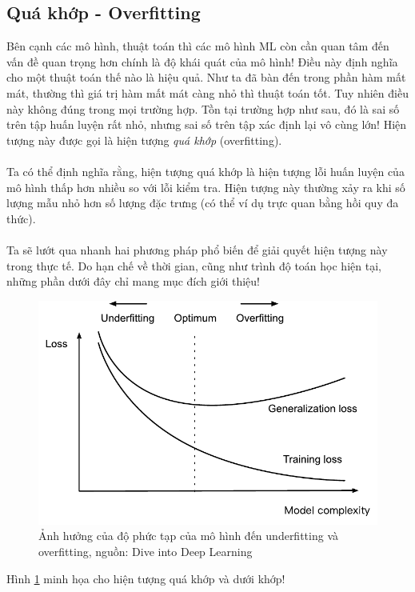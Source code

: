 \documentclass{article}
\begin{document}
 \subsection{Quá khớp - Overfitting}
 Bên cạnh các mô hình, thuật toán thì các mô hình ML còn cần quan tâm đến vấn đề quan trọng hơn chính là độ khái quát của mô hình! Điều này định nghĩa cho một thuật toán thế nào là hiệu quả. Như ta đã bàn đến trong phần hàm mất mát, thường thì giá trị hàm mất mát càng nhỏ thì thuật toán tốt. Tuy nhiên điều này không đúng trong mọi trường hợp. Tồn tại trường hợp như sau, đó là sai số trên tập huấn luyện rất nhỏ, nhưng sai số trên tập xác định lại vô cùng lớn! Hiện tượng này được gọi là hiện tượng \textit{quá khớp} (overfitting).\\\\
 Ta có thể định nghĩa rằng, hiện tượng quá khớp là hiện tượng lỗi huấn luyện của mô hình thấp hơn nhiều so với lỗi kiểm tra. Hiện tượng này thường xảy ra khi số lượng mẫu nhỏ hơn số lượng đặc trưng (có thể ví dụ trực quan bằng hồi quy đa thức).\\\\
 Ta sẽ lướt qua nhanh hai phương pháp phổ biến để giải quyết hiện tượng này trong thực tế. Do hạn chế về thời gian, cũng như trình độ toán học hiện tại, những phần dưới đây chỉ mang mục đích giới thiệu!
 \begin{figure}[ht!]
     \centering
     \includegraphics[width = 0.6\linewidth]{capacity-vs-error.pdf}
     \caption{Ảnh hưởng của độ phức tạp của mô hình đến underfitting và overfitting, nguồn: Dive into Deep Learning}
     \label{fig20}
 \end{figure}
 Hình \ref{fig20} minh họa cho hiện tượng quá khớp và dưới khớp!
\end{document}
